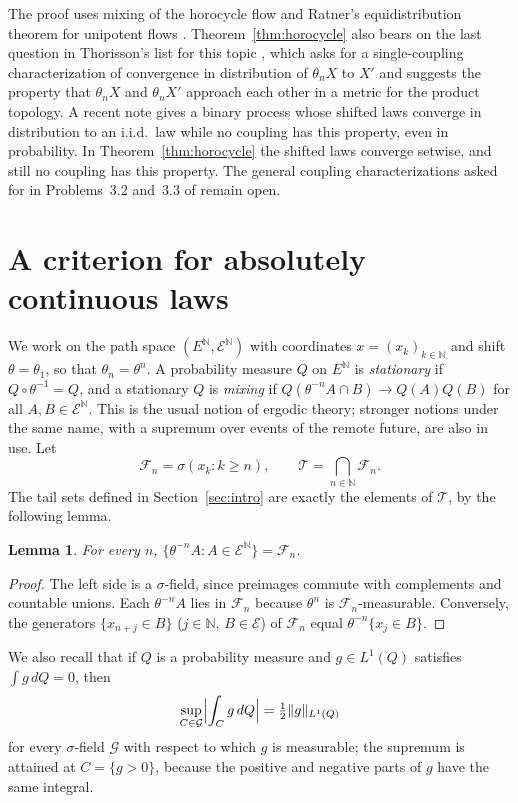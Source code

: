 \documentclass[11pt]{amsart}
\newtheorem{lemma}[theorem]{Lemma}
\theoremstyle{definition}
\theoremstyle{remark}
\newcommand{\N}{\mathbb N}
\newcommand{\cE}{\mathcal E}
\newcommand{\cF}{\mathcal F}
\newcommand{\cT}{\mathcal T}
\begin{document}
The proof uses mixing of the horocycle flow and Ratner's equidistribution theorem for unipotent flows \cite{Rat91}.
Theorem~\ref{thm:horocycle} also bears on the last question in Thorisson's list for this topic
\cite[Problem~3.3]{ThoPre}, which asks for a single-coupling characterization of convergence in distribution of
$\theta_nX$ to $X'$ and suggests the property that $\theta_nX$ and $\theta_nX'$ approach each other in a metric for the product
topology. A recent note \cite{WS26} gives a binary
process whose shifted laws converge in distribution to an i.i.d.\ law while no coupling has this property, even in
probability. In Theorem~\ref{thm:horocycle} the shifted laws converge setwise, and still no coupling has this property.
The general coupling characterizations asked for in Problems~3.2 and~3.3 of \cite{ThoPre} remain open.


\section{A criterion for absolutely continuous laws}\label{sec:criterion}

We work on the path space $(E^\N,\cE^\N)$ with coordinates $x=(x_k)_{k\in\N}$ and shift $\theta=\theta_1$, so that
$\theta_n=\theta^n$. A probability measure $Q$ on $E^\N$ is \emph{stationary} if $Q\circ\theta^{-1}=Q$, and a
stationary $Q$ is \emph{mixing} if $Q(\theta^{-n}A\cap B)\to Q(A)Q(B)$ for all $A,B\in\cE^\N$. This is the usual notion of
ergodic theory; stronger notions under the same name, with a supremum over events of the remote future, are also in
use. Let
\[
\cF_n=\sigma(x_k:k\ge n),\qquad \cT=\bigcap_{n\in\N}\cF_n .
\]
The tail sets defined in Section~\ref{sec:intro} are exactly the elements of $\cT$, by the following lemma.

\begin{lemma}\label{lem:preimage}
For every $n$, $\{\theta^{-n}A:A\in\cE^\N\}=\cF_n$.
\end{lemma}

\begin{proof}
The left side is a $\sigma$-field, since preimages commute with complements and countable unions. Each
$\theta^{-n}A$ lies in $\cF_n$ because $\theta^n$ is $\cF_n$-measurable. Conversely, the generators
$\{x_{n+j}\in B\}$ ($j\in\N$, $B\in\cE$) of $\cF_n$ equal $\theta^{-n}\{x_j\in B\}$.
\end{proof}

We also recall that if $Q$ is a probability measure and $g\in L^1(Q)$ satisfies $\int g\,dQ=0$, then
\begin{equation}\label{eq:halfnorm}
\sup_{C\in\mathcal G}\Bigl|\int_C g\,dQ\Bigr|=\tfrac12\|g\|_{L^1(Q)}
\end{equation}
for every $\sigma$-field $\mathcal G$ with respect to which $g$ is measurable; the supremum is attained at
$C=\{g>0\}$, because the positive and negative parts of $g$ have the same integral.
\end{document}
